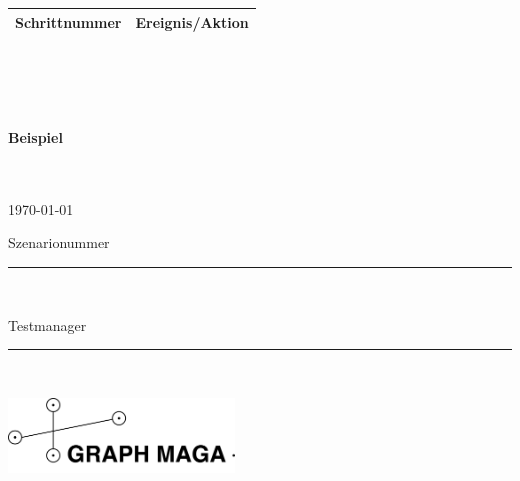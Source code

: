 \begin{tabular}{|c|l|}
\hline
\rule{0.00\textwidth}{0.5cm} \textbf{Schrittnummer} & \textbf{Ereignis/Aktion} \hspace{0.55\textwidth} \\[0.25cm]
\hline 
\end{tabular} \ \\

 \ \\
	
	 \ \\
	





\newpage
\paragraph{Beispiel} \ \\

\thispagestyle{empty} %


\begin{minipage}[l]{0.6\textwidth}
{\large \today}\\

{\large Szenarionummer \rule{1cm}{0.4pt}}\\

{\large Testmanager \rule{4cm}{0.4pt}}\\

\end{minipage}
\begin{minipage}{0.4\textwidth}
\includegraphics*[width=6cm]{Logo.png}
\end{minipage}\\


